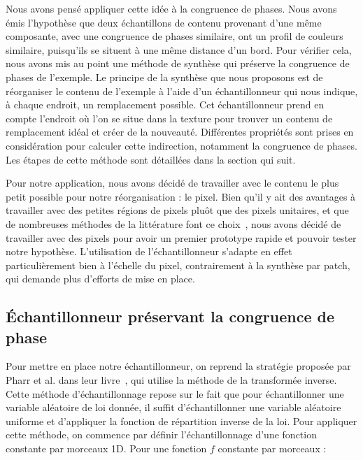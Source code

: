 \bigskip

Nous avons pensé appliquer cette idée à la congruence de phases. Nous avons émis l'hypothèse que deux échantillons de contenu provenant d'une même composante, avec une congruence de phases similaire, ont un profil de couleurs similaire, puisqu'ils se situent à une même distance d'un bord. Pour vérifier cela, nous avons mis au point une méthode de synthèse qui préserve la congruence de phases de l'exemple. Le principe de la synthèse que nous proposons est de réorganiser le contenu de l'exemple à l'aide d'un échantillonneur qui nous indique, à chaque endroit, un remplacement possible. Cet échantillonneur prend en compte l'endroit où l'on se situe dans la texture pour trouver un contenu de remplacement idéal et créer de la nouveauté. Différentes propriétés sont prises en considération pour calculer cette indirection, notamment la congruence de phases. Les étapes de cette méthode sont détaillées dans la section qui suit.

\bigskip

Pour notre application, nous avons décidé de travailler avec le contenu le plus petit possible pour notre réorganisation : le pixel. Bien qu'il y ait des avantages à travailler avec des petites régions de pixels pluôt que des pixels unitaires, et que de nombreuses méthodes de la littérature font ce choix~\cite{wei_state_2009}, nous avons décidé de travailler avec des pixels pour avoir un premier prototype rapide et pouvoir tester notre hypothèse. L'utilisation de l'échantillonneur s'adapte en effet particulièrement bien à l'échelle du pixel, contrairement à la synthèse par patch, qui demande plus d'efforts de mise en place.

\subsection{Échantillonneur préservant la congruence de phase}

Pour mettre en place notre échantillonneur, on reprend la stratégie proposée par Pharr et al. dans leur livre~\cite{pharr_physically_2023}, qui utilise la méthode de la transformée inverse. Cette méthode d'échantillonnage repose sur le fait que pour échantillonner une variable aléatoire de loi donnée, il suffit d'échantillonner une variable aléatoire uniforme et d'appliquer la fonction de répartition inverse de la loi. Pour appliquer cette méthode, on commence par définir l'échantillonnage d'une fonction constante par morceaux 1D. Pour une fonction $f$ constante par morceaux :


